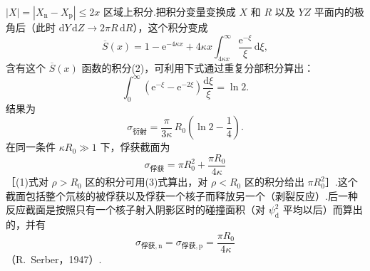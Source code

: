 \begin{xiti}
$|X|=|X_{\mathrm{n}}-X_{\mathrm{p}}|\leqslant2x$ 区域上积分.把积分变量变换成 $X$ 和 $R$ 以及 $YZ$ 平面内的极角后（此时 $\mathrm{d}Y\,\mathrm{d}Z\to2\pi R\,\mathrm{d}R$），这个积分变成
\begin{equation}
  \overline{S}(x)=1-\mathrm{e}^{-4\kappa x}
  +4\kappa x\int_{4\kappa x}^{\infty}\frac{\mathrm{e}^{-\xi}}{\xi}\,\mathrm{d}\xi,
\end{equation}
含有这个 $\overline{S}(x)$ 函数的积分(2)，可利用下式通过重复分部积分算出：
\begin{equation*}
  \int_0^{\infty}\left(\mathrm{e}^{-\xi}-\mathrm{e}^{-2\xi}\right)\frac{\mathrm{d}\xi}{\xi}=\ln2.
\end{equation*}
结果为
\begin{equation*}
  \sigma_{\text{衍射}}=\frac{\pi}{3\kappa}\,R_0\left(\ln2-\frac{1}{4}\right).
\end{equation*}
在同一条件 $\kappa R_0\gg1$ 下，俘获截面为
\begin{equation*}
  \sigma_{\text{俘获}}=\pi R_0^2+\frac{\pi R_0}{4\kappa}
\end{equation*}
［(1)式对 $\rho>R_0$ 区的积分可用(3)式算出，对 $\rho<R_0$ 区的积分给出 $\pi R_0^2$］.这个截面包括整个氘核的被俘获以及俘获一个核子而释放另一个（剥裂反应）.后一种反应截面是按照只有一个核子射入阴影区时的碰撞面积（对 $\psi_{\mathrm{d}}^2$ 平均以后）而算出的，并有
\begin{equation*}
  \sigma_{\text{俘获},\mathrm{n}}=\sigma_{\text{俘获},\mathrm{p}}=\frac{\pi R_0}{4\kappa}
\end{equation*}
（R.~Serber，1947）.

\end{xiti}
\setcounter{equation}{0}%
